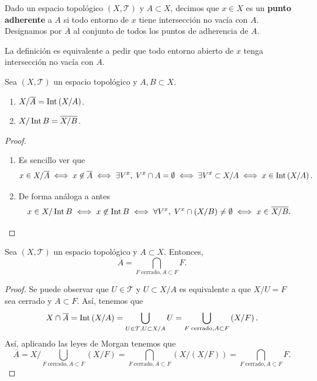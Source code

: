 \begin{definition}
Dado un espacio topológico $\displaystyle \left(X, \mathcal{T}\right) $ y $\displaystyle A \subset X $, decimos que $\displaystyle x \in X $ es un \textbf{punto adherente} a $\displaystyle A $ si todo entorno de $\displaystyle x $ tiene intersección no vacía con $\displaystyle A $. Designamos por $\displaystyle \overline{A} $ al conjunto de todos los puntos de adherencia de $\displaystyle A $.
\end{definition}
\begin{observation}
La definición es equivalente a pedir que todo entorno abierto de $\displaystyle x $ tenga intersección no vacía con $\displaystyle A $. 
\end{observation}

\begin{prop}
Sea $\displaystyle \left(X, \mathcal{T}\right) $ un espacio topológico y $\displaystyle A,B\subset X $. 
\begin{enumerate}
\item $\displaystyle X / \overline{A} = \operatorname{Int} \left(X / A\right) $.
\item $\displaystyle X/ \operatorname{Int} B = \overline{X/B} $.
\end{enumerate}
\end{prop}
\begin{proof}
\begin{enumerate}
\item Es sencillo ver que 
\[x \in X / \overline{A} \iff x \not\in \overline{A} \iff \exists V^{x}, \; V^{x}\cap A = \emptyset \iff \exists V^{x}  \subset X / A \iff x \in \operatorname{Int}\left(X/A\right) .\]
\item De forma análoga a antes
	\[x \in X / \operatorname{Int} B \iff x \not\in \operatorname{Int} B \iff \forall V^{x}, \; V^{x}\cap \left(X / B\right)\neq \emptyset \iff x \in \overline{X/B} .\]
\end{enumerate}
\end{proof}

\begin{prop}
Sea $\displaystyle \left(X, \mathcal{T}\right) $ un espacio topológico y $\displaystyle A \subset X $. Entonces, 
\[\overline{A}=\bigcap_{F \; \text{cerrado}, A \subset F}F .\]	
\end{prop}
\begin{proof}
Se puede observar que $\displaystyle U \in \mathcal{T} $ y $\displaystyle U \subset X / A $ es equivalente a que $\displaystyle X / U = F $ sea cerrado y $\displaystyle A \subset F $. Así, tenemos que 
\[X \cap \overline{A}= \operatorname{Int} \left(X / A\right) = \bigcup_{U \in \mathcal{T}, U \subset X / A}U = \bigcup_{F \; \text{cerrado}, A \subset F}\left(X/F\right) .\]
Así, aplicando las leyes de Morgan tenemos que 
\[\overline{A}=X / \bigcup_{F \; \text{cerrado}, A \subset F}\left(X / F\right) = \bigcap_{F \; \text{cerrado}, A\subset F}\left(X/\left(X/F\right)\right) = \bigcap_{F \; \text{cerrado}, A\subset F}F .\]
\end{proof}

